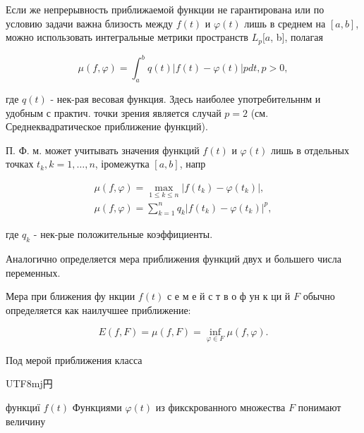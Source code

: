 \documentclass[10pt]{article}
\begin{document}
Если же непрерывность приближаемой функции не гарантирована или по условию задачи важна близость между $f(t)$ и $\varphi(t)$ лишь в среднем на $[a, b]$, можно использовать интегральные метрики пространств $L_{p}[a$, b], полагая



\[

\mu(f, \varphi)=\int_{a}^{b} q(t)|f(t)-\varphi(t)| p d t, p>0,

\]



где $q(t)$ - нек-рая весовая функция. Здесь наиболее употребительннм и удобным с практич. точки зрения является случай $p=2$ (см. Среднеквадратическое приближение функций).



П. Ф. м. может учитывать значения функций $f(t)$ и $\varphi(t)$ лишь в отдельных точках $t_{k}, k=1, \ldots, n$, іромежутка $[a, b]$, напр



\[

\begin{gathered}

\mu(f, \varphi)=\max _{1 \leqslant k \leqslant n}\left|f\left(t_{k}\right)-\varphi\left(t_{k}\right)\right|, \\

\mu(f, \varphi)=\sum_{k=1}^{n} q_{k}\left|f\left(t_{k}\right)-\varphi\left(t_{k}\right)\right|^{p},

\end{gathered}

\]



где $q_{k}$ - нек-рые положительные коэффициенты.



Аналогично определяется мера приближения функций двух и большего числа переменных.



Мера при ближения фу нкции $f(t)$ с е м е й с т в о ф ун к ци й $F$ обычно определяется как наилучшее приближение:



\[

E(f, F)=\mu(f, F)=\inf _{\varphi \in F} \mu(f, \varphi) .

\]



Под мерой приближения класса \begin{CJK}{UTF8}{mj}円\end{CJK} функциї $f(t)$ Функциями $\varphi(t)$ из фикскрованного множества $F$ понимают величину
\end{document}
